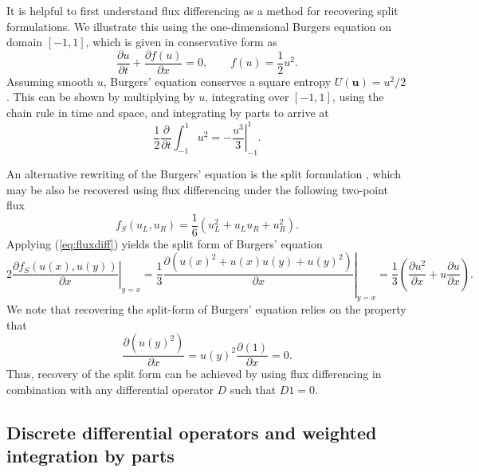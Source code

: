 \documentclass[preprint,10pt]{elsarticle}
\theoremstyle{definition}
\theoremstyle{lemma}
\theoremstyle{theorem}
\theoremstyle{assumption}
\newcommand{\pd}[2]{\frac{\partial#1}{\partial#2}}
\newcommand{\LRp}[1]{\left( #1 \right)}
\newcommand{\note}[1]{{\color{blue}{#1}}}
\begin{document}
It is helpful to first understand flux differencing as a method for recovering split formulations.  We illustrate this using the one-dimensional Burgers equation on domain $ [-1,1]$, which is given in conservative form as 
\[
\pd{u}{t} + \pd{f(u)}{x} = 0, \qquad f(u) = \frac{1}{2}u^2.
\]
Assuming smooth $u$, Burgers' equation conserves a square entropy $U(\bm{u}) = u^2/2$.   This can be shown by multiplying by $u$, integrating over $[-1,1]$, using the chain rule in time and space, and integrating by parts to arrive at
\begin{equation}
\frac{1}{2}\pd{}{t}\int_{-1}^1{u}^2 = -\left.\frac{u^3}{3}\right|_{-1}^1.
\label{eq:burgersconservation}
\end{equation}

An alternative rewriting of the Burgers' equation is the split formulation \cite{gassner2013skew, ranocha2017extended}, which may be also be recovered using flux differencing under the following two-point flux
\[
f_S(u_L,u_R) = \frac{1}{6}(u_L^2 + u_Lu_R + u_R^2).
\]
Applying (\ref{eq:fluxdiff}) yields the split form of Burgers' equation
\[
2\left.\pd{f_S(u(x),u(y))}{x}\right|_{y=x} = \frac{1}{3}\left.\pd{\LRp{u(x)^2 + u(x)u(y) + u(y)^2}}{x}\right|_{y=x} = \frac{1}{3}\LRp{\pd{u^2}{x} + u\pd{u}{x}}.
\]
We note that recovering the split-form of Burgers' equation relies on the property
that 
\[
\pd{\LRp{u(y)^2}}{x} = u(y)^2\pd{\LRp{1}}{x} = 0.  
\]
Thus, recovery of the split form can be achieved by using flux differencing in combination with any differential operator $D$ such that $D1 = 0$.  

\subsection{Discrete differential operators and weighted integration by parts}
\end{document}
